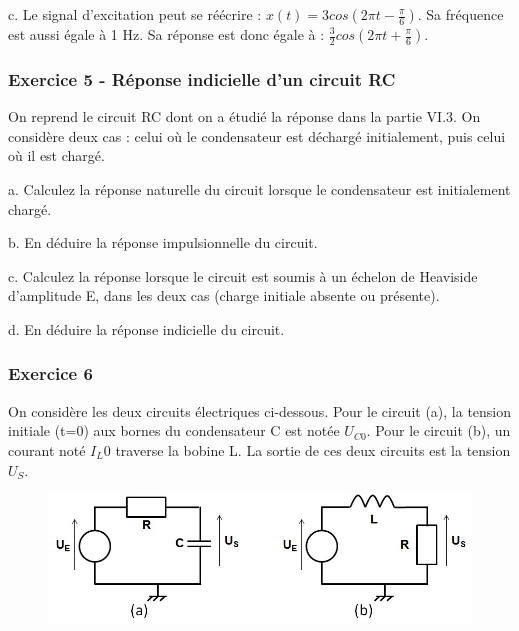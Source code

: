 \documentclass[11pt]{report}
\begin{document}
 	c. Le signal d'excitation peut se réécrire : $x(t)=3cos(2\pi t-\frac{\pi}{6})$. Sa fréquence est aussi égale à 1 Hz. Sa réponse est donc égale à : $\frac{3}{2}cos(2\pi t+\frac{\pi}{6})$.\\
 	
 	
 	
 
  	
 	\subsubsection{Exercice 5 - Réponse indicielle d'un circuit RC}
 	
 	On reprend le circuit RC dont on a étudié la réponse dans la partie VI.3. On considère deux cas : celui où le condensateur est déchargé initialement, puis celui où il est chargé. 
 	
 	a. Calculez la réponse naturelle du circuit lorsque le condensateur est initialement chargé.
 	
 	b. En déduire la réponse impulsionnelle du circuit.
 	
 	c. Calculez la réponse lorsque le circuit est soumis à un échelon de Heaviside d'amplitude E, dans les deux cas (charge initiale absente ou présente).
 	
 	d. En déduire la réponse indicielle du circuit.
 	 
 	\vspace{1\baselineskip}
 	
 	\subsubsection{Exercice 6}
 	
 	On considère les deux circuits électriques ci-dessous. Pour le circuit (a), la tension initiale (t=0) aux bornes du condensateur C est notée $U_{C0}$. Pour le circuit (b), un courant noté $I_L0$ traverse la bobine L. La sortie de ces deux circuits est la tension $U_{S}$.
 	
 	\begin{figure}[h!]
 		\centering
 		\includegraphics[scale=0.5]{images/Exo_2_4.jpg} 
 	\end{figure} 
 	
\end{document}

